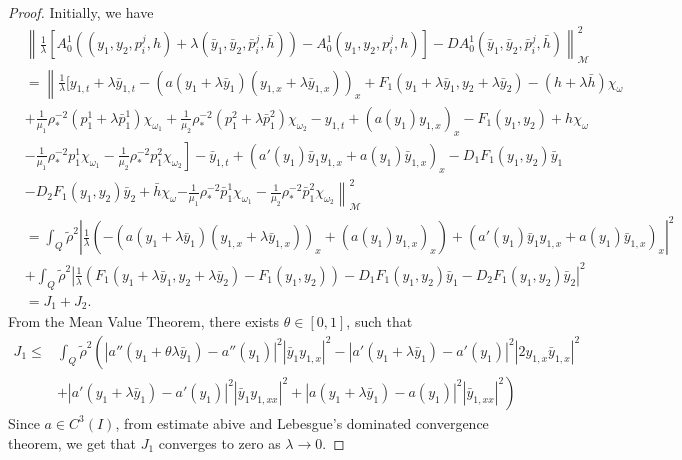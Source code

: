 \documentclass[10pt,a4paper]{amsart}
\begin{document}
\begin{proof}
    Initially, we have
    \begin{equation*}		
    	\begin{split}
    		&\left\| \frac{1}{\lambda}\left[ A^1_0 (( y_1, y_2, p_i^j, h)+\lambda(\bar y_1,\bar y_2,\bar p_i^j,\bar h)) - A^1_0( y_1, y_2, p_i^j, h) \right] - D A^1_0(\bar y_1,\bar y_2,\bar p_i^j,\bar h) \right\|^{2}_{\mathcal{M}} \\
    		&=\left\|
    		\frac{1}{\lambda}\Big[ y_{1,t}+\lambda \bar y_{1,t} - \left( a(y_1 + \lambda \bar y_1) (y_{1,x}+\lambda \bar y_{1,x}) \right)_x + F_1(y_1+\lambda \bar y_1, y_2+\lambda \bar y_2)- (h+\lambda \bar h) \chi_{\omega} \right.   \\
    		& \left. \left.    + \frac{1}{\mu_1} \rho_*^{-2} (p^1_1+\lambda \bar p^1_1) \chi_{\omega_1} + \frac{1}{\mu_2} \rho_*^{-2} (p^2_1+\lambda \bar p^2_1) \chi_{\omega_2} -y_{1,t} + \left( a(y_1) y_{1,x} \right)_x - F_1(y_1,y_2) + h \chi_{\omega}   \right. \right.\\
    		& \left. \left.    - \frac{1}{\mu_1} \rho_*^{-2} p^1_1 \chi_{\omega_1} - \frac{1}{\mu_2} \rho_*^{-2} p^2_1 \chi_{\omega_2} \right] -\bar y_{1,t} + (a'(y_{1})\bar y_{1} y_{1,x} +a(y_1) \bar y_{1,x})_x - D_1 F_1(y_1,y_2)\bar y_1 \right.\\
    		&  \left.  - D_2 F_1(y_1,y_2)\bar y_2 + \bar h \chi_{\omega} \right.  \left. -\frac{1}{\mu_1} \rho_*^{-2} \bar p^1_1 \chi_{\omega_{1}} -\frac{1}{\mu_2} \rho_*^{-2} \bar p^2_1 \chi_{\omega_{2}} \right\|^{2}_{\mathcal{M}} \\
    		& = \int_Q \tilde\rho^2 \left| \frac{1}{\lambda}\left( - \left( a(y_1 + \lambda \bar y_1) (y_{1,x}+\lambda \bar y_{1,x}) \right)_x + \left( a(y_1)y_{1,x} \right)_x \right) + (a'(y_{1})\bar y_{1} y_{1,x} +a(y_1) \bar y_{1,x})_x \right|^2 \\
            & + \int_Q \tilde\rho^2 \left| \frac{1}{\lambda}( F_1(y_1+\lambda\bar y_1,y_2 + \lambda\bar y_2) - F_1(y_1,y_2)) - D_1 F_1(y_1,y_2)\bar y_1 - D_2 F_1(y_1,y_2)\bar y_2 \right|^2 \\
            &= J_1+J_2.
    	\end{split}
    \end{equation*}From the Mean Value Theorem, there exists $\theta \in [0,1]$, such that
    \begin{equation*}
        \begin{split}
            J_1 \leq &\int_Q \tilde\rho^2 \left( \left| a''(y_1 + \theta \lambda \bar y_1) - a''(y_1) \right|^2 |\bar y_1 y_{1,x} |^2 - \left| a'(y_1 + \lambda \bar y_1)-a'(y_1) \right|^2 \left| 2 y_{1,x} \bar y_{1,x} \right|^2 \right.\\
            &\left.  + \left| a'(y_1+\lambda\bar y_1)-a'(y_1) \right|^2 |\bar y_1 y_{1,xx}|^2 + |a(y_1+\lambda\bar y_1)-a(y_1)|^2 |\bar y_{1,xx}|^2 \right) 
        \end{split}
    \end{equation*}Since $a \in C^3(I)$,  from estimate abive and Lebesgue's dominated convergence theorem, we get that $J_1$ converges to zero as $\lambda \to 0$.
    

\end{proof}
\end{document}
